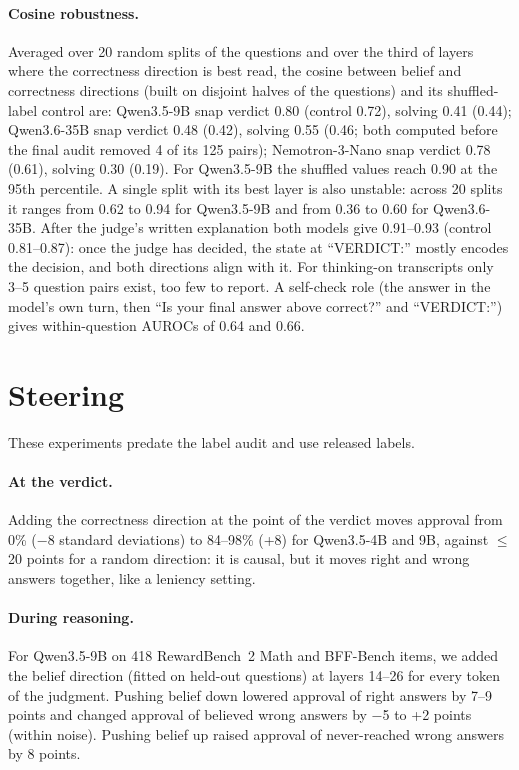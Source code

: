 \documentclass[11pt]{article}
\begin{document}
\paragraph{Cosine robustness.} Averaged over 20 random splits of the questions and over the third of layers where
the correctness direction is best read, the cosine between belief and correctness directions (built on disjoint
halves of the questions) and its shuffled-label control are: Qwen3.5-9B snap verdict 0.80 (control 0.72), solving
0.41 (0.44); Qwen3.6-35B snap verdict 0.48 (0.42), solving 0.55 (0.46; both computed before the final audit removed 4 of its 125
pairs); Nemotron-3-Nano snap verdict 0.78 (0.61), solving
0.30 (0.19). For Qwen3.5-9B the shuffled values reach 0.90 at the 95th percentile. A single split with its best
layer is also unstable: across 20 splits it ranges from 0.62 to 0.94 for Qwen3.5-9B and from 0.36 to 0.60 for
Qwen3.6-35B. After the judge's written explanation both
models give 0.91--0.93 (control 0.81--0.87): once the judge has decided, the state at ``VERDICT:'' mostly encodes the
decision, and both directions align with it. For thinking-on transcripts only 3--5 question pairs exist, too few to
report. A self-check role (the answer in the model's own turn, then ``Is your final answer above correct?'' and
``VERDICT:'') gives within-question AUROCs of 0.64 and 0.66.

\section{Steering}
\label{app:steering}

These experiments predate the label audit and use released labels.

\paragraph{At the verdict.} Adding the correctness direction at the point of the verdict moves approval from 0\%
($-$8 standard deviations) to 84--98\% (+8) for Qwen3.5-4B and 9B, against $\leq$20 points for a random direction:
it is causal, but it moves right and wrong answers together, like a leniency setting.

\paragraph{During reasoning.} For Qwen3.5-9B on 418 RewardBench~2 Math and BFF-Bench items, we added the belief
direction (fitted on held-out questions) at layers 14--26 for every token of the judgment. Pushing belief down
lowered approval of right answers by 7--9 points and changed approval of believed wrong answers by $-$5 to +2 points
(within noise). Pushing belief up raised approval of never-reached wrong answers by 8 points.
\end{document}
